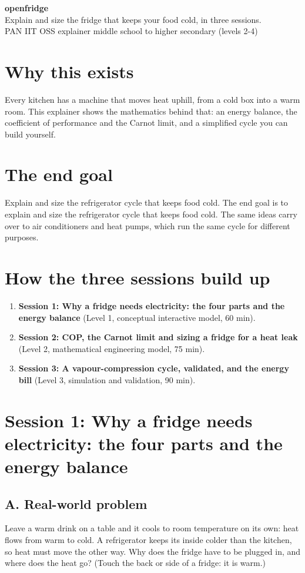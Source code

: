 \documentclass[11pt,a4paper]{article}
\begin{document}
\begin{center}{\LARGE\bfseries openfridge}\\[0.4em]{\large Explain and size the fridge that keeps your food cold, in three sessions.}\\[0.2em]\small PAN IIT OSS explainer \textbullet{} middle school to higher secondary (levels 2-4)\end{center}

\section*{Why this exists}
Every kitchen has a machine that moves heat uphill, from a cold box into a warm room. This explainer shows the mathematics behind that: an energy balance, the coefficient of performance and the Carnot limit, and a simplified cycle you can build yourself.

\section*{The end goal}
Explain and size the refrigerator cycle that keeps food cold. The end goal is to explain and size the refrigerator cycle that keeps food cold. The same ideas carry over to air conditioners and heat pumps, which run the same cycle for different purposes.

\section*{How the three sessions build up}
\begin{enumerate}[nosep]
\item \textbf{Session 1: Why a fridge needs electricity: the four parts and the energy balance} (Level 1, conceptual interactive model, 60 min).
\item \textbf{Session 2: COP, the Carnot limit and sizing a fridge for a heat leak} (Level 2, mathematical engineering model, 75 min).
\item \textbf{Session 3: A vapour-compression cycle, validated, and the energy bill} (Level 3, simulation and validation, 90 min).
\end{enumerate}

\section{Session 1: Why a fridge needs electricity: the four parts and the energy balance}

\subsection*{A. Real-world problem}
Leave a warm drink on a table and it cools to room temperature on its own: heat flows from warm to cold. A refrigerator keeps its inside colder than the kitchen, so heat must move the other way. Why does the fridge have to be plugged in, and where does the heat go? (Touch the back or side of a fridge: it is warm.)
\end{document}
